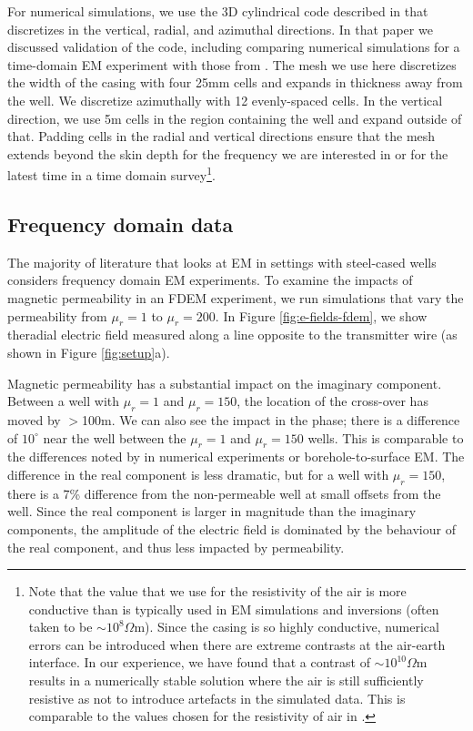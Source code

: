 \documentclass[onecolumn, extra, mreferee]{gji}
\begin{document}


For numerical simulations, we use the 3D cylindrical code described in \citep{heagy_modeling_2019} that discretizes in the vertical, radial, and azimuthal directions. In that paper we discussed validation of the code, including comparing numerical simulations for a time-domain EM experiment with those from \cite{commer_transient-electromagnetic_2015, Haber2007}. The mesh we use here discretizes the width of the casing with four 25mm cells and expands in thickness away from the well. We discretize azimuthally with 12 evenly-spaced cells. In the vertical direction, we use 5m cells in the region containing the well and expand outside of that. Padding cells in the radial and vertical directions ensure that the mesh extends beyond the skin depth for the frequency we are interested in or for the latest time in a time domain survey\footnote{Note that the value that we use for the resistivity of the air is more conductive than is typically used in EM simulations and inversions (often taken to be $\sim10^8 \Omega$m). Since the casing is so highly conductive, numerical errors can be introduced when there are extreme contrasts at the air-earth interface. In our experience, we have found that a contrast of $\sim10^{10} \Omega$m results in a numerically stable solution where the air is still sufficiently resistive as not to introduce artefacts in the simulated data. This is comparable to the values chosen for the resistivity of air in \citep{commer_transient-electromagnetic_2015, wilt_casing_2020}.}.

\subsection{Frequency domain data}
The majority of literature that looks at EM in settings with steel-cased wells considers frequency domain EM experiments. To examine the impacts of magnetic permeability in an FDEM experiment, we run simulations that vary the permeability from $\mu_r=1$ to $\mu_r=200$. In Figure \ref{fig:e-fields-fdem}, we show theradial electric field measured along a line opposite to the transmitter wire (as shown in Figure \ref{fig:setup}a).

Magnetic permeability has a substantial impact on the imaginary component. Between a well with $\mu_r=1$ and $\mu_r=150$, the location of the cross-over has moved by $>$100m. We can also see the impact in the phase; there is a difference of $10^{\circ}$ near the well between the $\mu_r=1$  and $\mu_r=150$ wells. This is comparable to the differences noted by \cite{cuevas_effect_2018} in numerical experiments or borehole-to-surface EM. The difference in the real component is less dramatic, but for a well with $\mu_r=150$, there is a 7\% difference from the non-permeable well at small offsets from the well. Since the real component is larger in magnitude than the imaginary components, the amplitude of the electric field is dominated by the behaviour of the real component, and thus less impacted by permeability.
\end{document}

